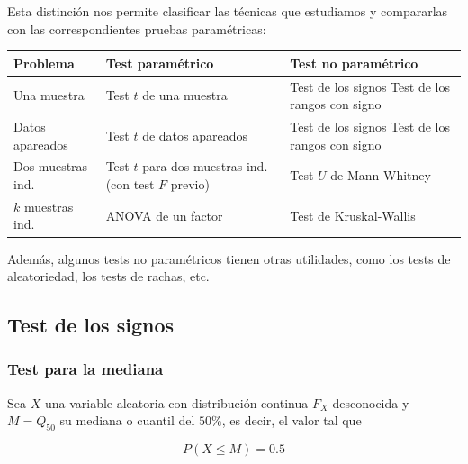 \documentclass[
]{article}
\begin{document}
Esta distinción nos permite clasificar las técnicas que estudiamos y compararlas con las correspondientes pruebas paramétricas:

\begin{longtable}[]{@{}
  >{\raggedright\arraybackslash}p{}
  >{\raggedright\arraybackslash}p{}
  >{\raggedright\arraybackslash}p{}@{}}
\toprule\noalign{}
\begin{minipage}[b]{\linewidth}\raggedright
Problema
\end{minipage} & \begin{minipage}[b]{\linewidth}\raggedright
Test paramétrico
\end{minipage} & \begin{minipage}[b]{\linewidth}\raggedright
Test no paramétrico
\end{minipage} \\
\midrule\noalign{}
\endhead
\bottomrule\noalign{}
\endlastfoot
Una muestra & Test \(t\) de una muestra & Test de los signos Test de los rangos con signo \\
Datos apareados & Test \(t\) de datos apareados & Test de los signos Test de los rangos con signo \\
Dos muestras ind. & Test \(t\) para dos muestras ind. (con test \(F\) previo) & Test \(U\) de Mann-Whitney \\
\(k\) muestras ind. & ANOVA de un factor & Test de Kruskal-Wallis \\
\end{longtable}

Además, algunos tests no paramétricos tienen otras utilidades, como los tests de aleatoriedad, los tests de rachas, etc.

\subsection{Test de los signos}\label{test-de-los-signos}

\subsubsection{Test para la mediana}\label{test-para-la-mediana}

Sea \(X\) una variable aleatoria con distribución continua \(F_{X}\) desconocida y \(M=Q_{50}\) su mediana o cuantil del \(50\%\), es decir, el valor tal que

\[
P(X \leq M)=0.5
\]
\end{document}
